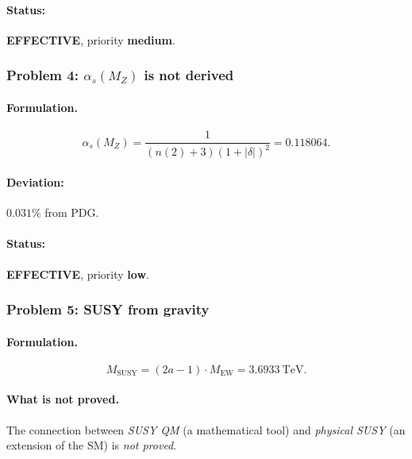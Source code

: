 \documentclass[11pt,a4paper]{article}
\newcommand{\MEW}{M_{\text{EW}}}
\newcommand{\MSUSY}{M_{\text{SUSY}}}
\theoremstyle{definition}
\begin{document}
\paragraph{Status:} \textbf{EFFECTIVE}, priority \textbf{medium}.

\subsubsection{Problem 4: $\alpha_s(M_Z)$ is not derived}

\paragraph{Formulation.}
\begin{equation}
    \alpha_s(M_Z) = \frac{1}{(n(2) + 3)(1 + |\delta|)^2}
    = 0.118064.
\end{equation}

\paragraph{Deviation:} $0.031\%$ from PDG.

\paragraph{Status:} \textbf{EFFECTIVE}, priority \textbf{low}.

\subsubsection{Problem 5: SUSY from gravity}

\paragraph{Formulation.}
\begin{equation}
    \MSUSY = (2a - 1) \cdot \MEW = 3.6933~\text{TeV}.
\end{equation}

\paragraph{What is not proved.}
The connection between \emph{SUSY QM} (a mathematical tool) and 
\emph{physical SUSY} (an extension of the SM) is \emph{not proved}.
\end{document}
